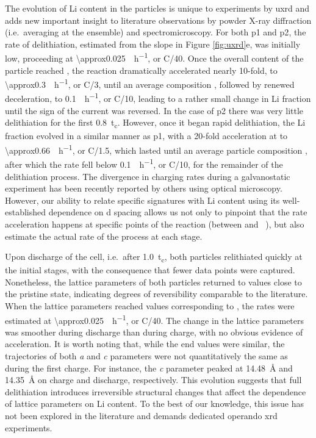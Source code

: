 \documentclass{article}
\begin{document}
The evolution of Li content in the particles is unique to experiments
by \gls{uxrd} and adds new important insight to literature
observations by powder X-ray diffraction (i.e.\ averaging at the
ensemble) and
spectromicroscopy\cite{doeff2017,wolf2017,hulzen2018,ahn2017,zhou2016-2,robert2015,yoon2006,hua2018,grenier2017,chapman2020,chueh2021,
  zhao2022, rao2021, wang2020-6}. For both \gls{p1} and \gls{p2}, the
rate of delithiation, estimated from the slope in Figure
\ref{fig:uxrd}e, was initially low, proceeding at
\SI{\approx0.025}{\per\hour}, or C/40. Once the overall content
of the particle reached , the reaction dramatically
accelerated nearly 10-fold, to \SI{\approx0.3}{\per\hour}, or
C/3, until an average composition , followed by renewed
deceleration, to \SI{0.1}{\per\hour}, or C/10, leading to a
rather small change in Li fraction until the sign of the current was
reversed. In the case of \gls{p2} there was very little delithiation
for the first \SI{0.8}{t_c}. However, once it began rapid
delithiation, the Li fraction evolved in a similar manner as \gls{p1},
with a 20-fold acceleration at  to
\SI{\approx0.66}{\per\hour}, or C/1.5, which lasted until an
average particle composition , after which the rate fell below
\SI{0.1}{\per\hour}, or C/10, for the remainder of the
delithiation process. The divergence in charging rates during a
galvanostatic experiment has been recently reported by others using
optical microscopy\cite{zhao2022}. However, our ability to relate
specific signatures with Li content using its well-established
dependence on d spacing allows us not only to pinpoint that the rate
acceleration happens at specific points of the reaction (between
 and ~), but also estimate the actual rate of the
process at each stage.

Upon discharge of the cell, i.e.\ after \SI{1.0}{t_c}, both particles
relithiated quickly at the initial stages, with the consequence that
fewer data points were captured. Nonetheless, the lattice parameters
of both particles returned to values close to the pristine state,
indicating degrees of reversibility comparable to the
literature\cite{robert2015}. When the lattice parameters reached
values corresponding to , the rates were estimated at
\SI{\approx0.025}{\per\hour}, or C/40. The change in the
lattice parameters was smoother during discharge than during charge,
with no obvious evidence of acceleration. It is worth noting that,
while the end values were similar, the trajectories of both \emph{a}
and \emph{c} parameters were not quantitatively the same as during the
first charge. For instance, the \emph{c} parameter peaked at
\SI{14.48}{\angstrom} and \SI{14.35}{\angstrom} on charge and
discharge, respectively. This evolution suggests that full
delithiation introduces irreversible structural changes that affect
the dependence of lattice parameters on Li content. To the best of our
knowledge, this issue has not been explored in the literature and
demands dedicated operando \gls{xrd} experiments.
\end{document}
